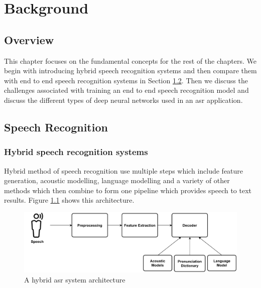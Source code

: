 \chapter{Background}
\label{chapter:background} 

\section{Overview}
This chapter focuses on the fundamental concepts for the rest of the chapters. We begin with introducing hybrid speech recognition systems and then compare them with end to end speech recognition systems in Section \ref{section:asr}. Then we discuss the challenges associated with training an end to end speech recognition model and discuss the different types of deep neural networks used in an \acrshort{asr} application.

\section{Speech Recognition}
\label{section:asr}

\subsection{Hybrid speech recognition systems}
\label{section:hybridasr}
Hybrid method of speech recognition use multiple steps which include feature generation, acoustic modelling, language modelling and a variety of other methods which then combine to form one pipeline which provides speech to text results. Figure \ref{fig:hyrid_asr_model} shows this architecture.

\begin{figure}[ht]
  \begin{center}
    \includegraphics[width=\textwidth]{images/Hybrid ASR System.pdf} 
    \caption{A hybrid \acrshort{asr} system architecture}
    \label{fig:hyrid_asr_model}
  \end{center}
\end{figure}

